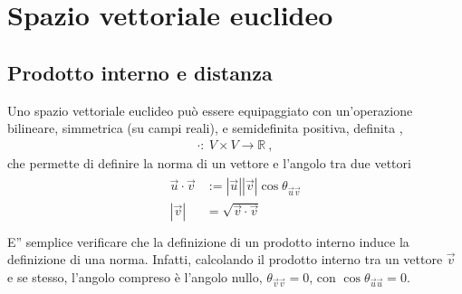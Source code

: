 \documentclass[letterpaper,10pt,italian]{jupyterBook}
\begin{document}
\sphinxstepscope




\section{Spazio vettoriale euclideo}
\label{\detokenize{ch/algebra/vector-algebra-euclidean-space:spazio-vettoriale-euclideo}}\label{\detokenize{ch/algebra/vector-algebra-euclidean-space:math-hs-algebra-vector-euclidean-space}}\label{\detokenize{ch/algebra/vector-algebra-euclidean-space::doc}}
\sphinxAtStartPar
{}

\sphinxAtStartPar
{}


\subsection{Prodotto interno e distanza}
\label{\detokenize{ch/algebra/vector-algebra-euclidean-space:prodotto-interno-e-distanza}}\label{\detokenize{ch/algebra/vector-algebra-euclidean-space:math-hs-algebra-vector-euclidean-space-inner-product}}
\sphinxAtStartPar
Uno spazio vettoriale euclideo può essere equipaggiato con un’operazione bilineare, simmetrica (su campi reali), e semi\sphinxhyphen{}definita positiva, definita ,
\begin{equation*}
\begin{split}\cdot: \ V \times V \rightarrow \mathbb{R} \ ,\end{split}
\end{equation*}
\sphinxAtStartPar
che permette di definire la norma di un vettore e l’angolo tra due vettori
\begin{equation*}
\begin{split}\begin{aligned}
  \vec{u} \cdot \vec{v} & := |\vec{u}||\vec{v}| \cos \theta_{\vec{u} \vec{v}}  \\
              |\vec{v}| & = \sqrt{\vec{v} \cdot \vec{v}}  \\
\end{aligned}\end{split}
\end{equation*}
\sphinxAtStartPar
E” semplice verificare che la definizione di un prodotto interno induce la definizione di una norma. Infatti, calcolando il prodotto interno tra un vettore \(\vec{v}\) e se stesso, l’angolo compreso è l’angolo nullo, \(\theta_{\vec{v} \vec{v}} = 0\), con \(\cos \theta_{\vec{u}\vec{u}} = 0\).
\end{document}
